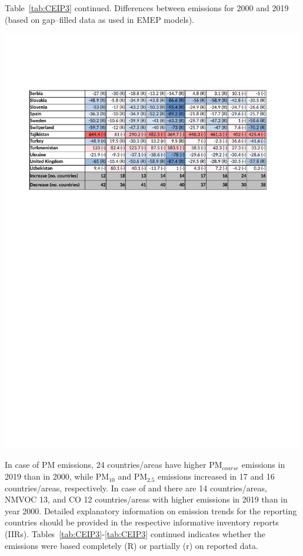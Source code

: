 \begin{table}
  \caption*{Table~\ref{tab:CEIP3} continued. Differences between emissions for 2000 and 2019 (based on gap--filled data as used in EMEP models).}
\centering
{\includegraphics*[viewport=45 520 535 735,clip,width=0.99\textwidth]{FIGS_CEIP/Table3_page2.pdf}}
\label{tab:CEIP3contd}  
\end{table}

In case of PM emissions, 24 countries/areas have higher PM$_{coarse}$ emissions in 2019 than in 2000, while PM$_{10}$ and PM$_{2.5}$ emissions increased in 17 and 16 countries/areas, respectively. In case of \nox and \sox there are 14  countries/areas, NMVOC 13,  and CO 12
countries/areas with higher emissions in 2019 than in year 2000. Detailed explanatory information on emission trends for the reporting countries should be provided in the respective informative inventory reports (IIRs). Tables~\ref{tab:CEIP3}-\ref{tab:CEIP3} continued indicates whether the emissions were based completely  (R) or partially (r) on reported data. 

